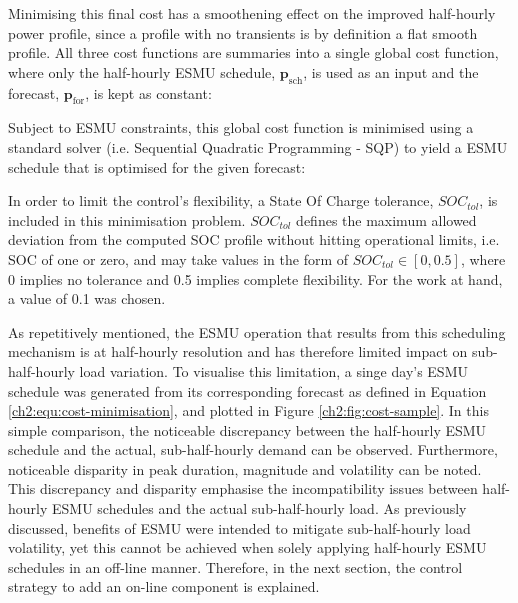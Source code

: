 

Minimising this final cost has a smoothening effect on the improved half-hourly power profile, since a profile with no transients is by definition a flat smooth profile.
All three cost functions are summaries into a single global cost function, where only the half-hourly ESMU schedule, $\textbf{p}_\text{sch}$, is used as an input and the forecast, $\textbf{p}_\text{for}$, is kept as constant:



Subject to ESMU constraints, this global cost function is minimised using a standard solver (i.e. Sequential Quadratic Programming - SQP) to yield a ESMU schedule that is optimised for the given forecast:



In order to limit the control's flexibility, a State Of Charge tolerance, $SOC_{tol}$, is included in this minimisation problem.
$SOC_{tol}$ defines the maximum allowed deviation from the computed SOC profile without hitting operational limits, i.e. SOC of one or zero, and may take values in the form of $SOC_{tol} \in [0, 0.5]$, where 0 implies no tolerance and 0.5 implies complete flexibility.
For the work at hand, a value of 0.1 was chosen.



As repetitively mentioned, the ESMU operation that results from this scheduling mechanism is at half-hourly resolution and has therefore limited impact on sub-half-hourly load variation.
To visualise this limitation, a singe day's ESMU schedule was generated from its corresponding forecast as defined in Equation \ref{ch2:equ:cost-minimisation}, and plotted in Figure \ref{ch2:fig:cost-sample}.
In this simple comparison, the noticeable discrepancy between the half-hourly ESMU schedule and the actual, sub-half-hourly demand can be observed.
Furthermore, noticeable disparity in peak duration, magnitude and volatility can be noted.
This discrepancy and disparity emphasise the incompatibility issues between half-hourly ESMU schedules and the actual sub-half-hourly load.
As previously discussed, benefits of ESMU were intended to mitigate sub-half-hourly load volatility, yet this cannot be achieved when solely applying half-hourly ESMU schedules in an off-line manner.
Therefore, in the next section, the control strategy to add an on-line component is explained.




 